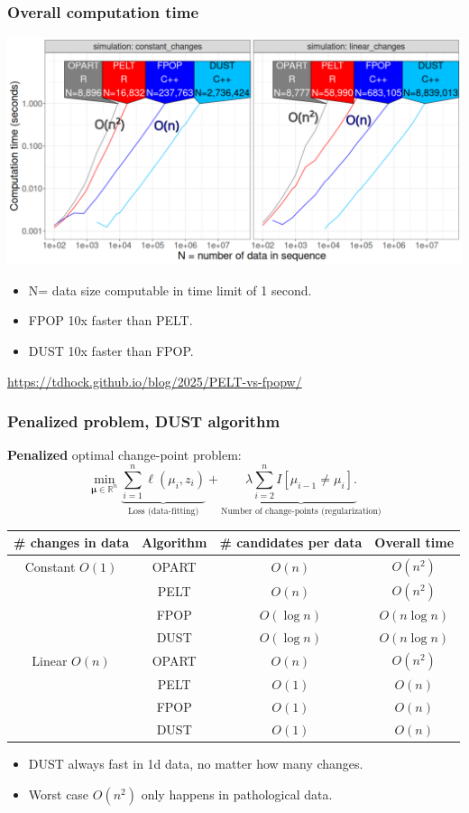 \documentclass{beamer}
\newcommand{\algo}[1]{\textcolor{#1}{#1}}
\newcommand{\RR}{\mathbb R}
\newcommand{\algo}[1]{\textcolor{#1}{#1}}
\begin{document}
\begin{frame}
  \frametitle{Overall computation time}
  \includegraphics[width=\textwidth]{figure-pred-seconds-O.png}

  \begin{itemize}
  \item N= data size computable in time limit of 1 second.
  \item FPOP 10x faster than PELT.
  \item DUST 10x faster than FPOP.
  \end{itemize}

  \url{https://tdhock.github.io/blog/2025/PELT-vs-fpopw/}
\end{frame}

\begin{frame}
  \frametitle{Penalized problem, DUST algorithm}
  \textbf{Penalized} optimal change-point problem:
$$
\min_{
  \mathbf \mu\in\RR^{n}
}
\underbrace{\sum_{i=1}^{n} \ell( \mu_i,  z_i)}_{\text{Loss (data-fitting)}} + \underbrace{\lambda\sum_{i=2}^n I[\mu_{i-1}\neq \mu_i].}_{\text{Number of change-points (regularization)}}
$$
\begin{tabular}{cccc}
  \# changes in data & Algorithm & \# candidates per data & Overall time \\
  \hline
  Constant $O(1)$ & \algo{OPART} &  $O(n)$ & $O(n^2)$\\
                     & \algo{PELT} &  $O(n)$ & $O(n^2)$\\
                     & \algo{FPOP} &  \textcolor{FPOP}{$O(\log n)$} & \textcolor{FPOP}{$O(n\log n)$}\\
                     & \algo{DUST} &  \textcolor{DUST}{$O(\log n)$} & \textcolor{DUST}{$O(n\log n)$}\\
  \hline
  Linear $O(n)$ & \algo{OPART} &  $O(n)$ & $O(n^2)$ \\
   & \algo{PELT} &  \textcolor{PELT}{$O(1)$} & \textcolor{PELT}{$O(n)$} \\
   & \algo{FPOP} &  \textcolor{FPOP}{$O(1)$} & \textcolor{FPOP}{$O(n)$} \\
   & \algo{DUST} &  \textcolor{DUST}{$O(1)$} & \textcolor{DUST}{$O(n)$} \\
\end{tabular}

\begin{itemize}
\item DUST always fast in 1d data, no matter how many changes.
\item Worst case $O(n^2)$ only happens in pathological data.
\end{itemize}
\end{frame}
 
\end{document}
